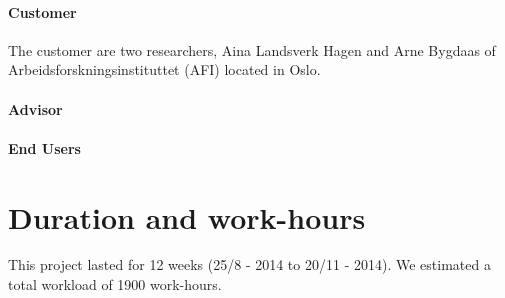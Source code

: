 \paragraph*{\textbf{Customer}} 
The customer are two researchers, Aina Landsverk Hagen and Arne Bygdaas of Arbeidsforskningsinstituttet (AFI) located in Oslo. 
\paragraph*{\textbf{Advisor}} 
\paragraph*{\textbf{End Users}} 

\section{Duration and work-hours} This project lasted for 12 weeks (25/8 - 2014 to 20/11 - 2014). We estimated a total workload of 1900 work-hours.